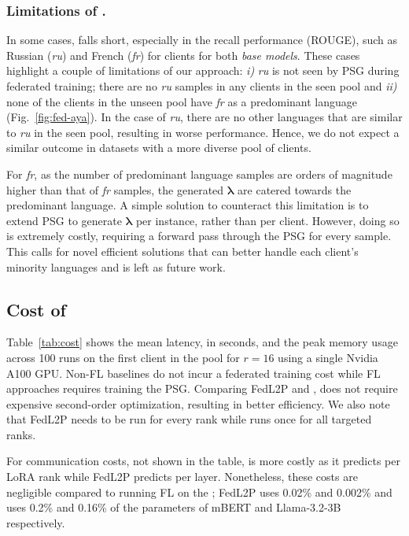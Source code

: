 \subsubsection{Limitations of \method{}.} In some cases, \method{} falls short, especially in the recall performance (ROUGE), such as Russian (\textit{ru}) and French (\textit{fr}) for \unseen{} clients for both {\em base models}. These cases highlight a couple of limitations of our approach: \textit{i)} \textit{ru} is not seen by PSG during federated training; there are no \textit{ru} samples in any clients in the seen pool and \textit{ii)} none of the clients in the unseen pool have \textit{fr} as a predominant language (Fig.~\ref{fig:fed-aya}). In the case of \textit{ru}, there are no other languages that are similar to \textit{ru} in the seen pool, resulting in worse performance. Hence, we do not expect a similar outcome in datasets with a more diverse pool of clients.

For \textit{fr}, as the number of predominant language samples are orders of magnitude higher than that of \textit{fr} samples, the generated $\bm{\lambda}$ are catered towards the predominant language. A simple solution to counteract this limitation is to extend PSG to generate $\bm{\lambda}$ per instance, rather than per client. However, doing so is extremely costly, requiring a forward pass through the PSG for every sample. This calls for novel efficient solutions that can better handle each client's minority languages and is left as future work.

\subsection{Cost of \method{}}

Table~\ref{tab:cost} shows the mean latency, in seconds, and the peak memory usage across 100 runs on the first client in the \seen{} pool for $r=16$ using a single Nvidia A100 GPU. Non-FL baselines do not incur a federated training cost while FL approaches requires training the PSG. Comparing FedL2P and \method{}, \method{} does not require expensive second-order optimization, resulting in better efficiency. We also note that FedL2P needs to be run for every rank while \method{} runs once for all targeted ranks.

For communication costs, not shown in the table, \method{} is more costly as it predicts per LoRA rank while FedL2P predicts per layer. Nonetheless, these costs are negligible compared to running FL on the \basemodel{}; FedL2P uses 0.02\% and 0.002\% and \method{} uses 0.2\% and 0.16\% of the parameters of mBERT and Llama-3.2-3B respectively.

